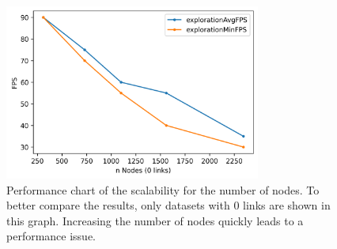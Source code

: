 \begin{table}[!hbt]
     \caption[Results from the performance evaluation.]{Results from the performance evaluation, separated into duration of the layout phase in seconds and render performance in FPS during the exploration phase. Test setup: Ryzen 7 3700X + Radeon RX 590.}
     \label{table:resultFPS}
\end{table}

\begin{figure}[!hbt]
    \centering
    \includegraphics[width=0.75\textwidth]{graphics/performanceAnalysisNodes2.png}
    \caption[Performance chart of the scalability for the number of nodes.]{Performance chart of the scalability for the number of nodes. To better compare the results, only datasets with 0 links are shown in this graph. Increasing the number of nodes quickly leads to a performance issue.} 
    \label{fig:performanceNodes} 
\end{figure}


